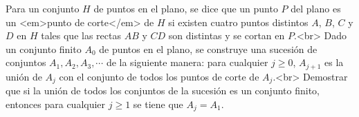 Para un conjunto $H$ de puntos en el plano, se dice que un punto $P$ del plano es un <em>punto de corte</em> de $H$ si existen cuatro puntos distintos $A$, $B$, $C$ y $D$ en $H$ tales que las rectas $AB$ y $CD$ son distintas y se cortan en $P$.<br>
Dado un conjunto finito $A_0$ de puntos en el plano, se construye una sucesión de conjuntos $A_1, A_2, A_3, \cdots$ de la siguiente manera: para cualquier $j \geq 0$, $A_{j+1}$ es la unión de $A_j$ con el conjunto de todos los puntos de corte de $A_j$.<br>
Demostrar que si la unión de todos los conjuntos de la sucesión es un conjunto finito, entonces para cualquier $j \geq 1$ se tiene que $A_j = A_1$.

